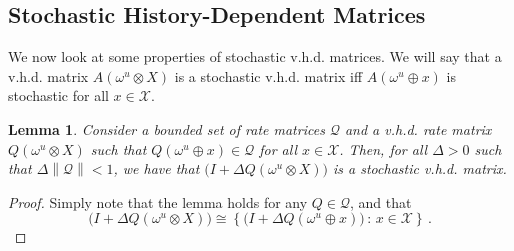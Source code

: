\documentclass[a4paper,reqno]{amsart}
\newtheorem{lemma}[theorem]{Lemma}
\newcommand{\states}{\mathcal{X}}
\newcommand{\norm}[1]{\left\lVert #1 \right\rVert}
\begin{document}
\subsection{Stochastic History-Dependent Matrices}

We now look at some properties of stochastic v.h.d. matrices. We will say that a v.h.d. matrix $A(\omega^u\otimes X)$ is a stochastic v.h.d. matrix iff $A(\omega^u\oplus x)$ is stochastic for all $x\in\states$.

\begin{lemma}
Consider a bounded set of rate matrices $\mathcal{Q}$ and a v.h.d. rate matrix $Q(\omega^u\otimes X)$ such that $Q(\omega^u\oplus x)\in\mathcal{Q}$ for all $x\in\states$. Then, for all $\Delta>0$ such that $\Delta\norm{\mathcal{Q}}<1$, we have that $\bigl(I + \Delta Q(\omega^u\otimes X)\bigr)$ is a stochastic v.h.d. matrix.
\end{lemma}
\begin{proof}
Simply note that the lemma holds for any $Q\in\mathcal{Q}$, and that
\begin{equation*}
\bigl(I+\Delta Q(\omega^u\otimes X)\bigr)\cong \left\{\bigl(I+\Delta Q(\omega^u\oplus x)\bigr)\,:\,x\in\states\right\}\,.
\end{equation*}
\end{proof}
\end{document}
